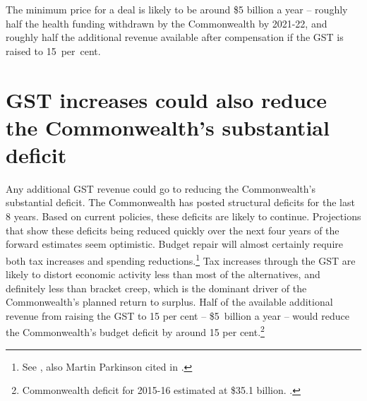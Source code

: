 The minimum price for a deal is likely to be around \$5 billion a year – roughly half the health funding withdrawn by the Commonwealth by 2021-22,  and roughly half the additional revenue available after compensation if the GST is raised to 15~per~cent.

\section{GST increases could also reduce the Commonwealth's substantial deficit}\label{sec:GST-4-2}
Any additional GST revenue could go to reducing the Commonwealth’s substantial deficit. The Commonwealth has posted structural deficits for the last 8 years.  Based on current policies, these deficits are likely to continue. Projections that show these deficits being reduced quickly over the next four years of the forward estimates seem optimistic.  Budget repair will almost certainly require both tax increases and spending reductions.\footnote{See , also Martin Parkinson cited in \textcite{Uren2015-Parkinson-tackle-spending-revenue}.}  Tax increases through the GST are likely to distort economic activity less than most of the alternatives, and definitely less than bracket creep, which is the dominant driver of the Commonwealth’s planned return to surplus.  Half of the available additional revenue from raising the GST to 15 per cent – \$5~billion a year  – would reduce the Commonwealth’s budget deficit by around 15 per cent.\footnote{Commonwealth deficit for 2015-16 estimated at \$35.1 billion. \textcite{Treasury2015FinalBudgetOutcome1415}.} 

